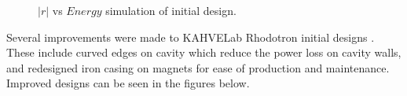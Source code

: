 \documentclass{article}
\begin{document}
\begin{figure}[H]
    \centering
    \vspace{1pt}
    \vspace{5pt}
    \caption{\centering $|r|$ vs $Energy$ simulation of initial design.} 
    \label{fig:initial_designs_PIC_phase_space_monitor}
\end{figure}

Several improvements were made to KAHVELab Rhodotron initial designs \cite{sinan}. These include curved edges on cavity which reduce the power loss on cavity walls, and redesigned iron casing on magnets for ease of production and maintenance.
Improved designs can be seen in the figures below.
\end{document}
